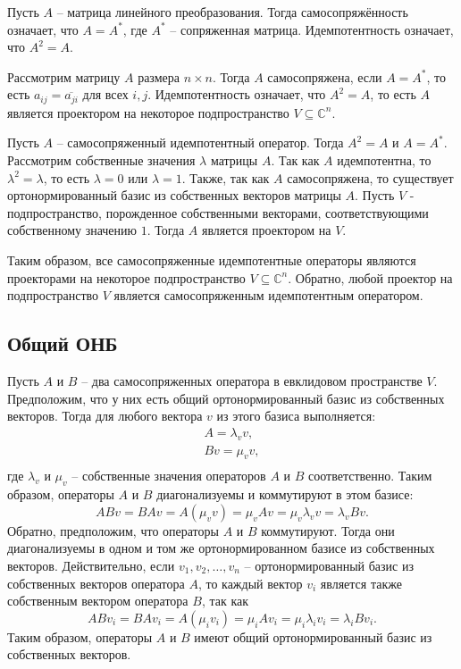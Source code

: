 Пусть $A$ -- матрица линейного преобразования.
Тогда самосопряжённость означает, что $A = A^*$, где $A^*$ -- сопряженная матрица.
Идемпотентность означает, что $A^2 = A$.

Рассмотрим матрицу $A$ размера $n \times n$.
Тогда $A$ самосопряжена, если $A = A^*$, то есть $a_{ij} = \overline{a_{ji}}$ для всех $i, j$.
Идемпотентность означает, что $A^2 = A$, то есть $A$ является проектором на некоторое подпространство
$V \subseteq \mathbb{C}^n$.

Пусть $A$ -- самосопряженный идемпотентный оператор.
Тогда $A^2 = A$ и $A = A^*$.
Рассмотрим собственные значения $\lambda$ матрицы $A$.
Так как $A$ идемпотентна, то $\lambda^2 = \lambda$, то есть $\lambda = 0$ или $\lambda = 1$.
Также, так как $A$ самосопряжена, то существует ортонормированный базис из собственных векторов матрицы $A$.
Пусть $V$ - подпространство, порожденное собственными векторами, соответствующими собственному значению $1$.
Тогда $A$ является проектором на $V$.

Таким образом, все самосопряженные идемпотентные операторы являются проекторами на некоторое подпространство
$V \subseteq \mathbb{C}^n$.
Обратно, любой проектор на подпространство $V$ является самосопряженным идемпотентным оператором.

 \subsection*{Общий ОНБ}

Пусть $A$ и $B$ -- два самосопряженных оператора в евклидовом пространстве $V$.
Предположим, что у них есть общий ортонормированный базис из собственных векторов.
Тогда для любого вектора $v$ из этого базиса выполняется:
\begin{gather*}
    A = \lambda_v v,\\
    Bv = \mu_v v,\\
\end{gather*}
где $\lambda_v$ и $\mu_v$ -- собственные значения операторов $A$ и $B$ соответственно.
Таким образом, операторы $A$ и $B$ диагонализуемы и коммутируют в этом базисе:
\[ ABv = BA v = A(\mu_v v) = \mu_v Av = \mu_v \lambda_v v = \lambda_v Bv. \]
Обратно, предположим, что операторы $A$ и $B$ коммутируют.
Тогда они диагонализуемы в одном и том же ортонормированном базисе из собственных векторов.
Действительно, если $v_1, v_2, \dots, v_n$ -- ортонормированный базис из собственных векторов оператора $A$, то
каждый вектор $v_i$ является также собственным вектором оператора $B$, так как
\[ ABv_i = BA v_i = A(\mu_i v_i) = \mu_i Av_i = \mu_i \lambda_i v_i = \lambda_i Bv_i. \]
Таким образом, операторы $A$ и $B$ имеют общий ортонормированный базис из собственных векторов.


